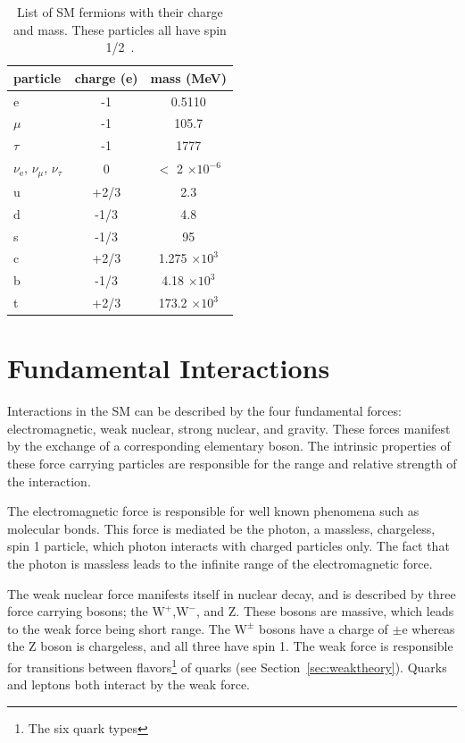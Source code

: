 \begin{table}[h]
\begin{center}
\begin{tabular}{l|c|c}
\hline
\hline
particle & charge (e) & mass (MeV)\\ \hline \hline
e & -1 & 0.5110 \\
$\mu$ & -1 & 105.7\\
$\tau$ & -1 & 1777\\
$\nu_{\mathrm{e}}$, $\nu_{\mu}$, $\nu_{\tau}$ & 0 & $<$ 2 $\times \mathrm{10^{-6}}$ \\
u & +2/3 & 2.3\\
d & -1/3 & 4.8\\
s & -1/3 & 95\\
c & +2/3 & 1.275 $\times \mathrm{10^3}$ \\
b & -1/3 & 4.18 $\times \mathrm{10^3}$\\
t & +2/3 & 173.2 $\times \mathrm{10^3}$\\
\hline
\end{tabular}
\end{center}
\caption{List of SM fermions with their charge and mass.  These particles all have spin 1/2~\cite{PDG-2014}.}
\label{table:SMferm}
\end{table}


\section{Fundamental Interactions}
Interactions in the SM can be described by the four fundamental forces: electromagnetic, weak nuclear, strong nuclear, and gravity.  
These forces manifest by the exchange of a corresponding elementary boson.  
The intrinsic properties of these force carrying particles are responsible for the range and relative strength of the interaction.


The electromagnetic force is responsible for well known phenomena such as molecular bonds.  
This force is mediated be the photon, a massless, chargeless, spin 1 particle, which photon interacts with charged particles only.        
The fact that the photon is massless leads to the infinite range of the electromagnetic force.  


The weak nuclear force manifests itself in nuclear decay, and is described by three force carrying bosons; the $\mathrm{W^+}$,$\mathrm{W^-}$, and Z.  
These bosons are massive, which leads to the weak force being short range.  
The $\mathrm{W^{\pm}}$ bosons have a charge of $\pm$e   whereas the Z boson is chargeless, and all three have spin 1.  
The weak force is responsible for transitions between flavors\footnote{The six quark types} of quarks (see Section~\ref{sec:weaktheory}).
Quarks and leptons both interact by the weak force.


